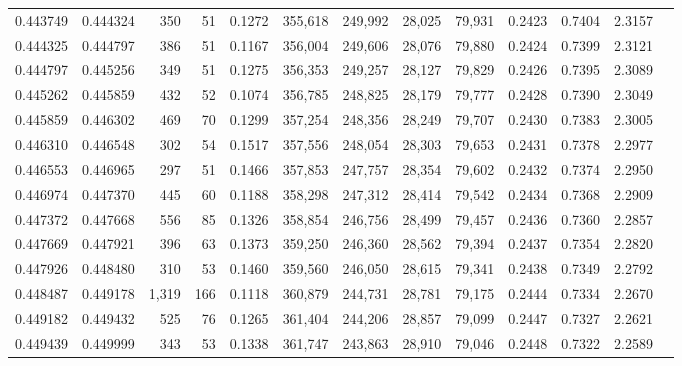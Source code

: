 \begin{tabular}{rrrrrrrrrrrrr}
0.443749 & 0.444324 &   350 &  51 &                                     0.1272 & 355,618 & 249,992 &  28,025 &  79,931 & 0.2423 & 0.7404 & 2.3157 \\
0.444325 & 0.444797 &   386 &  51 &                                     0.1167 & 356,004 & 249,606 &  28,076 &  79,880 & 0.2424 & 0.7399 & 2.3121 \\
0.444797 & 0.445256 &   349 &  51 &                                     0.1275 & 356,353 & 249,257 &  28,127 &  79,829 & 0.2426 & 0.7395 & 2.3089 \\
0.445262 & 0.445859 &   432 &  52 &                                     0.1074 & 356,785 & 248,825 &  28,179 &  79,777 & 0.2428 & 0.7390 & 2.3049 \\
0.445859 & 0.446302 &   469 &  70 &                                     0.1299 & 357,254 & 248,356 &  28,249 &  79,707 & 0.2430 & 0.7383 & 2.3005 \\
0.446310 & 0.446548 &   302 &  54 &                                     0.1517 & 357,556 & 248,054 &  28,303 &  79,653 & 0.2431 & 0.7378 & 2.2977 \\
0.446553 & 0.446965 &   297 &  51 &                                     0.1466 & 357,853 & 247,757 &  28,354 &  79,602 & 0.2432 & 0.7374 & 2.2950 \\
0.446974 & 0.447370 &   445 &  60 &                                     0.1188 & 358,298 & 247,312 &  28,414 &  79,542 & 0.2434 & 0.7368 & 2.2909 \\
0.447372 & 0.447668 &   556 &  85 &                                     0.1326 & 358,854 & 246,756 &  28,499 &  79,457 & 0.2436 & 0.7360 & 2.2857 \\
0.447669 & 0.447921 &   396 &  63 &                                     0.1373 & 359,250 & 246,360 &  28,562 &  79,394 & 0.2437 & 0.7354 & 2.2820 \\
0.447926 & 0.448480 &   310 &  53 &                                     0.1460 & 359,560 & 246,050 &  28,615 &  79,341 & 0.2438 & 0.7349 & 2.2792 \\
0.448487 & 0.449178 & 1,319 & 166 &                                     0.1118 & 360,879 & 244,731 &  28,781 &  79,175 & 0.2444 & 0.7334 & 2.2670 \\
0.449182 & 0.449432 &   525 &  76 &                                     0.1265 & 361,404 & 244,206 &  28,857 &  79,099 & 0.2447 & 0.7327 & 2.2621 \\
0.449439 & 0.449999 &   343 &  53 &                                     0.1338 & 361,747 & 243,863 &  28,910 &  79,046 & 0.2448 & 0.7322 & 2.2589 \\

\end{tabular}
